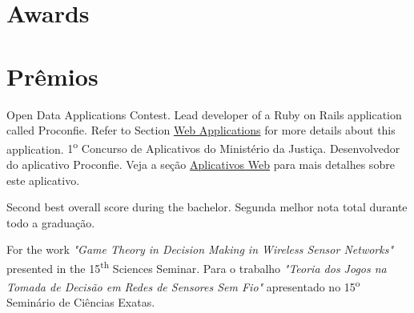  {\section{Awards}\label{sec:awards}}{\section{Prêmios}\label{sec:awards}}

	{
		{Open Data Applications Contest. Lead developer of a Ruby on Rails application called Proconfie. Refer to Section \hyperref[sec:web_app]{Web Applications} for more details about this application.}
		{1\textsuperscript{o} Concurso de Aplicativos do Ministério da Justiça. Desenvolvedor do aplicativo Proconfie. Veja a seção \hyperref[sec:web_app]{Aplicativos Web} para mais detalhes sobre este aplicativo.}}

	{
		        {Second best overall score during the bachelor.}
		        {Segunda melhor nota total durante todo a graduação.}}

	{
		{For the work \emph{"Game Theory in Decision Making in Wireless Sensor Networks"} presented in the 15\textsuperscript{th} Sciences Seminar.}
		{Para o trabalho \emph{"Teoria dos Jogos na Tomada de Decisão em Redes de Sensores Sem Fio"} apresentado no 15\textsuperscript{o} Seminário de Ciências Exatas.}}



